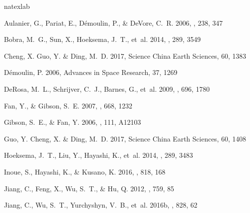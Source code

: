 \documentclass[twocolumn]{aastex6} %
\begin{document}
\begin{CJK*}{UTF8}{gbsn}
%
%
\begin{thebibliography}{}
\expandafter\ifx\csname natexlab\endcsname\relax\def\natexlab#1{#1}\fi

{Aulanier}, G., {Pariat}, E., {D{\'e}moulin}, P., \& {DeVore}, C.~R. 2006,
  \solphys, 238, 347

{Bobra}, M.~G., {Sun}, X., {Hoeksema}, J.~T., {et~al.} 2014, \solphys, 289,
  3549

Cheng, X. Guo, Y. \& Ding, M.~D. 2017, Science China Earth Sciences, 60, 1383

D{\'e}moulin, P. 2006, Advances in Space Research, 37, 1269

{DeRosa}, M.~L., {Schrijver}, C.~J., {Barnes}, G., {et~al.} 2009, \apj, 696,
  1780

{Fan}, Y., \& {Gibson}, S.~E. 2007, \apj, 668, 1232

Gibson, S.~E., \& Fan, Y. 2006, \jgr, 111, A12103

Guo, Y. Cheng, X. \& Ding, M.~D. 2017, Science China Earth Sciences, 60, 1408

{Hoeksema}, J.~T., {Liu}, Y., {Hayashi}, K., {et~al.} 2014, \solphys, 289, 3483

{Inoue}, S., {Hayashi}, K., \& {Kusano}, K. 2016, \apj, 818, 168

{Jiang}, C., {Feng}, X., {Wu}, S.~T., \& {Hu}, Q. 2012, \apj, 759, 85

Jiang, C., Wu, S.~T., Yurchyshyn, V.~B., {et~al.} 2016b, \apj, 828, 62


\end{thebibliography}
\end{CJK*}
\end{document}
